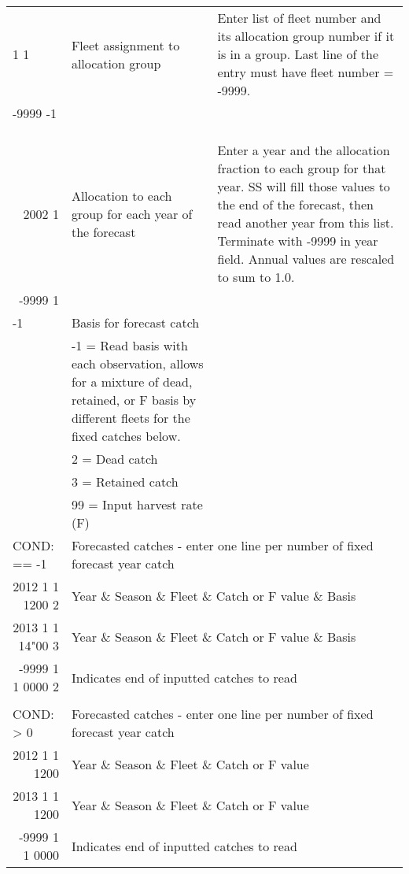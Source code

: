 \begin{landscape}
\begin{longtable}{p{3cm} p{7cm} p{11cm}}
  \hline
  1 1  & Fleet assignment to allocation group & \multirow{1}{1cm}[-0.1cm]{\parbox{11cm}{Enter list of fleet number and its allocation group number if it is in a group. Last line of the entry must have fleet number = -9999.}} \\
  -9999 -1  & & \\ \\ \\
    
  \pagebreak
  \multicolumn{3}{l}{COND: if N allocation groups is >0 } \\
  \multicolumn{1}{r}{2002 1}  & Allocation to each group for each year of the forecast & Enter a year and the allocation fraction to each group for that year.  SS will fill those values to the end of the forecast, then read another year from this list.  Terminate with -9999 in year field. Annual values are rescaled to sum to 1.0. \\
  \multicolumn{1}{r}{-9999 1} & & \\
  
  \hline
    -1 & Basis for forecast catch & \\
    & -1 = Read basis with each observation, allows for a mixture of dead, retained, or F basis by different fleets for the fixed catches below. & \\
    & 2 = Dead catch & \\
    & 3 = Retained catch & \\
    & 99 = Input harvest rate (F) & \\
    
  \hline
  \multicolumn{1}{l}{COND: == -1 }& \multicolumn{2}{l}{Forecasted catches - enter one line per number of fixed forecast year catch }\\
  \multicolumn{1}{r}{2012 1 1 1200 2}  & \multicolumn{2}{l}{Year \& Season \& Fleet \& Catch or F value \& Basis}  \\
  \multicolumn{1}{r}{2013 1 1 14"00 3}  & \multicolumn{2}{l}{Year \& Season \& Fleet \& Catch or F value \& Basis}  \\
  \multicolumn{1}{r}{-9999 1 1 0000 2}  & \multicolumn{2}{l}{Indicates end of inputted catches to read}  \\
  \\
  \multicolumn{1}{l}{COND: > 0 }& \multicolumn{2}{l}{Forecasted catches - enter one line per number of fixed forecast year catch }\\
  \multicolumn{1}{r}{2012  1 1 1200}  & \multicolumn{2}{l}{Year \& Season \& Fleet \& Catch or F value}  \\
  \multicolumn{1}{r}{2013  1 1 1200}  & \multicolumn{2}{l}{Year \& Season \& Fleet \& Catch or F value}  \\
  \multicolumn{1}{r}{-9999 1 1 0000}  & \multicolumn{2}{l}{Indicates end of inputted catches to read}  \\
  

\end{longtable}
\end{landscape}

